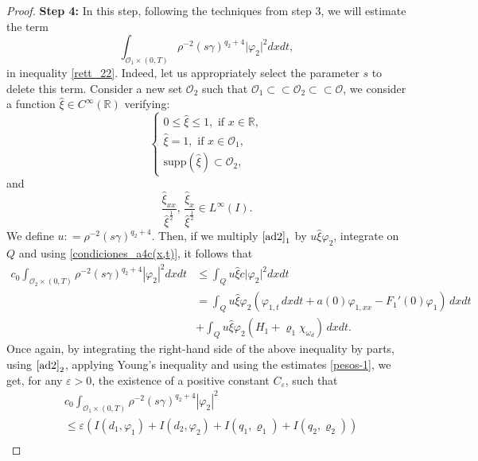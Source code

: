 \documentclass[11pt,a4paper]{amsart}
\numberwithin{equation}{section}
\begin{document}
\begin{proof}
\textbf{Step 4:} In this step,  following the techniques from step $3$, we will estimate the term $$\int_{\mathcal{O}_1\times (0,T)}\rho^{-2}(s\gamma)^{q_2+4}\vert \varphi_2 \vert^2dxdt,$$ in inequality \eqref{rett_22}. Indeed, let us appropriately select the parameter $s$ to delete this term. Consider a new set $\mathcal{O}_2$ such that $\mathcal{O}_1 \subset \subset\mathcal{O}_2 \subset \subset \mathcal{O} $,  we consider a function $\hat{\xi} \in C^\infty (\mathbb{R})$ verifying:
\begin{equation*}
	\begin{cases}
		0\leq \hat{\xi} \leq 1, \text{ if }x \in\mathbb{R}, \\
		\hat{\xi} = 1 ,\text{ if }x \in \mathcal{O}_1, \\
         \text{supp}(  \hat{\xi}) \subset \mathcal{O}_{2},
	\end{cases}
\end{equation*} and 
\begin{equation*}
	\frac{\hat{\xi}_{xx}}{\hat{\xi}^\frac{1}{2}}, \, 
	\frac{\hat{\xi}_x}{\hat{\xi}^\frac{1}{2}}\in L^\infty(I).
\end{equation*}We define $u: = \rho^{-2} (s\gamma)^{q_2+4}$.  Then, if   we multiply $\eqref{ad2}_1$ by $u\hat{\xi} \varphi_2$, integrate on $Q$ and using \eqref{condiciones_a4c(x,t)},  it follows that
\begin{equation*}
\begin{split}
c_0\int_{\mathcal{O}_{2}\times (0,T)} \rho^{-2} (s \gamma)^{q_2+4} |\varphi_2|^2dxdt &\leq \int_Q u\hat{\xi}c\vert \varphi_2 \vert^2dxdt\\
&=\int_Q u\hat{\xi} \varphi_2(\varphi_{1,t}\,dxdt+a(0)\varphi_{1,xx}-F_1'(0)\varphi_1 )\,dxdt\\
   & +\int_{Q} u\hat{\xi} \varphi_2( H_1+\varrho_1\chi_{\omega_{d}})\,dxdt.
\end{split}
\end{equation*}Once again, by integrating the right-hand side of the above inequality by parts, using $\eqref{ad2}_2$,  applying Young's inequality  and using  the  estimates \eqref{pesos-1},   we get, for any $\varepsilon>0$, the existence of a positive constant $C_{\varepsilon}$, such that
\begin{equation}\label{rrett_3}
    \begin{split}
    &c_0\int_{\mathcal{O}_1\times (0,T)} \rho^{-2} (s \gamma)^{q_2+4} |\varphi_2|^2 \\
     &\leq \varepsilon \left( I(d_1,\varphi_1)+I(d_2,\varphi_2)+I(q_1,\varrho_1)+I(q_2,\varrho_2)\right)\\

\end{split}
\end{equation}
\end{proof}
\end{document}
